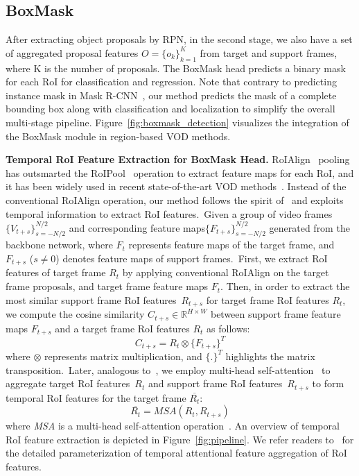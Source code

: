 \documentclass[10pt,twocolumn,letterpaper]{article}
\begin{document}
\subsection{BoxMask}
\label{sec:boxMask}
After extracting object proposals by RPN, in the second stage, we also have a set of aggregated proposal features $O = \{o_k\}_{k=1}^{K}$ from target and support frames, where K is the number of proposals. The BoxMask head predicts a binary mask for each RoI for classification and regression. Note that contrary to predicting instance mask in Mask R-CNN~\cite{he2017mask}, our method predicts the mask of a complete bounding box along with classification and localization to simplify the overall multi-stage pipeline. Figure~\ref{fig:boxmask_detection} visualizes the integration of the BoxMask module in region-based VOD methods.

\vspace{3pt}
\noindent \textbf{Temporal RoI Feature Extraction for BoxMask Head.}
\label{sec:roi_feature}
RoIAlign~\cite{he2017mask} pooling has outsmarted the RoIPool~\cite{girshick2015fast} operation to extract feature maps for each RoI, and it has been widely used in recent state-of-the-art VOD methods~\cite{wu2019sequence, han2020mining}. Instead of the conventional RoIAlign operation, our method follows the spirit of~\cite{gong2021temporal} and exploits temporal information to extract RoI features.~Given a group of video frames $\{V_{t+s}\}_{s=-N/2}^{N/2}$ and corresponding feature maps$\{F_{t+s}\}_{s=-N/2}^{N/2}$ generated from the backbone network, where $F_{t}$ represents feature maps of the target frame, and $F_{t+s}$ ($s\neq0$) denotes feature maps of support frames.~First, we extract RoI features of target frame $R_{t}$ by applying conventional RoIAlign on the target frame proposals, and target frame feature maps $F_{t}$. Then, in order to extract the most similar support frame RoI features~$R_{t+s}$ for target frame RoI features $R_{t}$, we compute the cosine similarity $C_{t+s}\in \mathbb{R}^{H \times W}$ between support frame feature maps $F_{t+s}$ and a target frame RoI features $R_{t}$ as follows:
\begin{equation}
    \label{eq:cos_sim}
    C_{t+s} = R_{t} \otimes \{F_{t+s}\}^{T}
\end{equation}
where $\otimes$ represents matrix multiplication, and $\{.\}^{T}$ highlights the matrix transposition.~Later, analogous to~\cite{gong2021temporal}, we employ multi-head self-attention~\cite{vaswani2017attention} to aggregate target RoI features~$R_{t}$ and support frame RoI features~$R_{t+s}$ to form temporal RoI features for the target frame $\overline{R_{t}}$: 
\begin{equation}
    \overline{R_{t}} = \textit{MSA}(R_{t}, R_{t+s}) 
\end{equation}
where \textit{MSA} is a multi-head self-attention operation~\cite{vaswani2017attention}. An overview of temporal RoI feature extraction is depicted in Figure~\ref{fig:pipeline}. We refer readers to~\cite{gong2021temporal} for the detailed parameterization of temporal attentional feature aggregation of RoI features.
\end{document}
